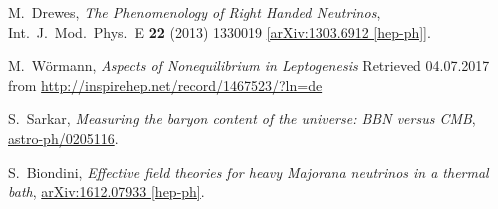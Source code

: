 \begin{thebibliography}{56}
M.~Drewes,
\textit{The Phenomenology of Right Handed Neutrinos},
Int.\ J.\ Mod.\ Phys.\ E {\textbf{22}} (2013) 1330019
\href{https://arxiv.org/abs/1303.6912}{[arXiv:1303.6912 [hep-ph]]}.

M.~Wörmann,
\textit{Aspects of Nonequilibrium in Leptogenesis}
Retrieved 04.07.2017 from \href{http://inspirehep.net/record/1467523/?ln=de}{http://inspirehep.net/record/1467523/?ln=de}

S.~Sarkar,
\textit{Measuring the baryon content of the universe: BBN versus CMB}, \href{https://arxiv.org/abs/astro-ph/0205116}{astro-ph/0205116}.

S.~Biondini,
\textit{Effective field theories for heavy Majorana neutrinos in a thermal bath},
\href{https://arxiv.org/abs/1612.07933}{arXiv:1612.07933 [hep-ph]}.
\end{thebibliography}
